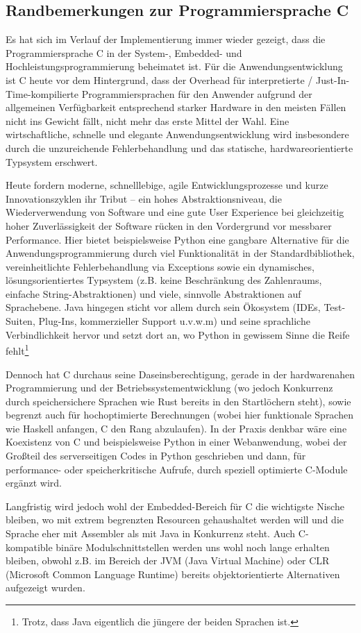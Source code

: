 \subsection{Randbemerkungen zur Programmiersprache C}
Es hat sich im Verlauf der Implementierung immer wieder gezeigt, dass die Programmiersprache C in der System-, Embedded-
und Hochleistungsprogrammierung beheimatet ist. Für die Anwendungsentwicklung ist C heute vor dem Hintergrund, dass der
Overhead für interpretierte / Just-In-Time-kompilierte Programmiersprachen für den Anwender aufgrund der allgemeinen
Verfügbarkeit entsprechend starker Hardware in den meisten Fällen nicht ins Gewicht fällt, nicht mehr das erste Mittel
der Wahl. Eine wirtschaftliche, schnelle und elegante Anwendungsentwicklung wird insbesondere durch die unzureichende
Fehlerbehandlung und das statische, hardwareorientierte Typsystem erschwert.

Heute fordern moderne, schnelllebige, agile Entwicklungsprozesse und kurze Innovationszyklen ihr Tribut -- ein hohes
Abstraktionsniveau, die Wiederverwendung von Software und eine gute User Experience bei gleichzeitig hoher
Zuverlässigkeit der Software rücken in den Vordergrund vor messbarer Performance. Hier bietet beispielsweise Python eine
gangbare Alternative für die Anwendungsprogrammierung durch viel Funktionalität in der Standardbibliothek,
vereinheitlichte Fehlerbehandlung via Exceptions sowie ein dynamisches, lösungsorientiertes Typsystem (z.B. keine
Beschränkung des Zahlenraums, einfache String-Abstraktionen) und viele, sinnvolle Abstraktionen auf Sprachebene.
Java hingegen sticht vor allem durch sein Ökosystem (IDEs, Test-Suiten, Plug-Ins, kommerzieller Support u.v.w.m) und
seine sprachliche Verbindlichkeit hervor und setzt dort an, wo Python in gewissem Sinne die Reife fehlt\footnote{Trotz,
dass Java eigentlich die jüngere der beiden Sprachen ist.}

Dennoch hat C durchaus seine Daseinsberechtigung, gerade in der hardwarenahen Programmierung und der Betriebssystementwicklung
(wo jedoch Konkurrenz durch speichersichere Sprachen wie Rust bereits in den Startlöchern steht), sowie begrenzt auch
für hochoptimierte Berechnungen (wobei hier funktionale Sprachen wie Haskell anfangen, C den Rang abzulaufen). In der
Praxis denkbar wäre eine Koexistenz von C und beispielsweise Python in einer Webanwendung, wobei der Großteil des
serverseitigen Codes in Python geschrieben und dann, für performance- oder speicherkritische Aufrufe, durch speziell
optimierte C-Module ergänzt wird.

Langfristig wird jedoch wohl der Embedded-Bereich für C die wichtigste Nische bleiben, wo mit extrem begrenzten Resourcen
gehaushaltet werden will und die Sprache eher mit Assembler als mit Java in Konkurrenz steht. Auch C-kompatible binäre
Modulschnittstellen werden uns wohl noch lange erhalten bleiben, obwohl z.B. im Bereich der JVM (Java Virtual Machine)
oder CLR (Microsoft Common Language Runtime) bereits objektorientierte Alternativen aufgezeigt wurden.